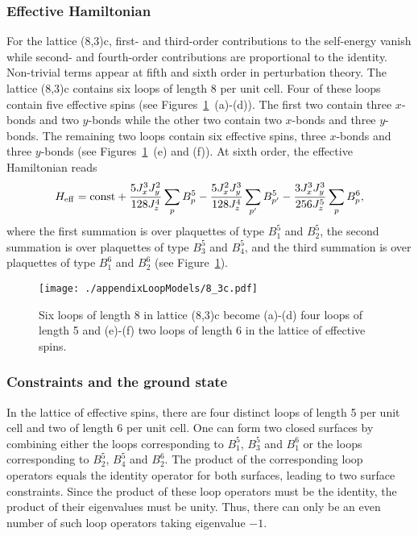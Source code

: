 \subsubsection{Effective Hamiltonian}
%
%
For the lattice (8,3)c, first- and third-order contributions to the self-energy vanish while second- and fourth-order contributions are proportional to the identity.
Non-trivial terms appear at fifth and sixth order in perturbation theory.
The lattice (8,3)c contains six loops of length 8 per unit cell.
Four of these loops contain five effective spins (see Figures~\ref{fig:appendix1_8_3c}~(a)-(d)).
The first two contain three $x$-bonds and two $y$-bonds while the other two contain two $x$-bonds and three $y$-bonds.
The remaining two loops contain six effective spins, three $x$-bonds and three $y$-bonds (see Figures~\ref{fig:appendix1_8_3c}~(e) and (f)).
At sixth order, the effective Hamiltonian reads
%
\begin{equation}
H_{\rm eff} = {\rm const} + \frac{5 J_x^3 J_y^2}{128 J_z^4} \sum_{p} B^5_p - \frac{5 J_x^2 J_y^3}{128 J_z^4} \sum_{p'} B^5_{p'} - \frac{3 J_x^3 J_y^3}{256 J_z^5} \sum_{p} B^6_{p},
\label{eq:8_3c_Heff}
\end{equation}
%
where the first summation is over plaquettes of type $B^5_1$ and $B^5_2$, the second summation is over plaquettes of type $B^5_3$ and $B^5_4$, and the third summation is over plaquettes of type $B^6_1$ and $B^6_2$ (see Figure~\ref{fig:appendix1_8_3c}).

%
\begin{figure}[tb]
	\centering
	\texttt{[image: ./appendixLoopModels/8\_3c.pdf]}
	\caption{Six loops of length 8 in lattice (8,3)c become (a)-(d) four loops of length 5 and (e)-(f) two loops of length 6 in the lattice of effective spins.}
	\label{fig:appendix1_8_3c}
\end{figure}
%


%
%
\subsubsection{Constraints and the ground state}
%
%
In the lattice of effective spins, there are four distinct loops of length 5 per unit cell and two of length 6 per unit cell.
One can form two closed surfaces by combining either the loops corresponding to $B_1^5$, $B_3^5$ and $B_1^6$ or the loops corresponding to $B_2^5$, $B_4^5$ and $B_2^6$.
The product of the corresponding loop operators equals the identity operator for both surfaces, leading to two surface constraints.
Since the product of these loop operators must be the identity, the product of their eigenvalues must be unity.
Thus, there can only be an even number of such loop operators taking eigenvalue $-1$.

